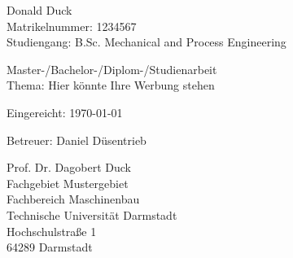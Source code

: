 \begin{tabular}{c}\end{tabular}
\vfill
Donald Duck\\
Matrikelnummer: 1234567\\
Studiengang: B.Sc. Mechanical and Process Engineering
 
Master-/Bachelor-/Diplom-/Studienarbeit\\
Thema: Hier könnte Ihre Werbung stehen

Eingereicht: \today

Betreuer: Daniel Düsentrieb

Prof. Dr. Dagobert Duck\\
Fachgebiet Mustergebiet\\
Fachbereich Maschinenbau\\
Technische Universität Darmstadt\\
Hochschulstraße 1\\
64289 Darmstadt